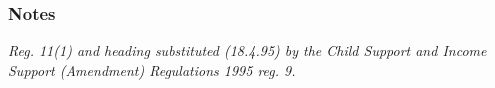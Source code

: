 \documentclass[a4paper]{article}
\newcommand\amendment[1]{\subsubsection*{Notes}{\itshape\frenchspacing\footnotesize #1 \par}}
\begin{document}
\amendment{
Reg. 11(1) and heading substituted (18.4.95) by the Child Support and Income Support (Amendment) Regulations 1995 reg. 9.
}

%
%
%
%
\end{document}

